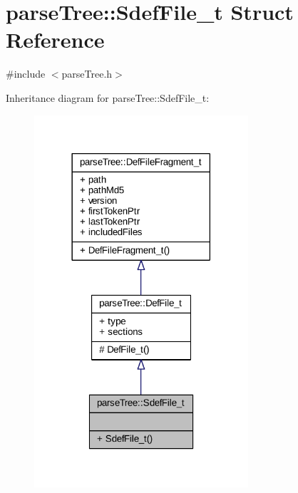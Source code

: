 \hypertarget{structparse_tree_1_1_sdef_file__t}{}\section{parse\+Tree\+:\+:Sdef\+File\+\_\+t Struct Reference}
\label{structparse_tree_1_1_sdef_file__t}


{\ttfamily \#include $<$parse\+Tree.\+h$>$}



Inheritance diagram for parse\+Tree\+:\+:Sdef\+File\+\_\+t\+:
\nopagebreak
\begin{figure}[H]
\begin{center}
\leavevmode
\includegraphics[width=225pt]{structparse_tree_1_1_sdef_file__t__inherit__graph}
\end{center}
\end{figure}


